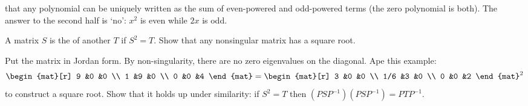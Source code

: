 \begin{exercises}
\begin{answer}
      that any polynomial can be uniquely
       written as the sum of even-powered and odd-powered terms (the
       zero polynomial is both).
       The answer to the second half is `no': \( x^2 \) is even while
       \( 2x \) is odd.  
     \end{answer}
   \item 
     A matrix \( S \) is the 
     of another \( T \) if \( S^2=T \).
     Show that any nonsingular matrix has a square root.
     \begin{answer}
         Put the matrix in Jordan form.
         By non-singularity, there are no zero eigenvalues on the diagonal.
         Ape this example:
          \begin{equation*}
             \begin{mat}[r]
                9  &0  &0 \\
                1  &9  &0 \\
                0  &0  &4
             \end{mat}
             =
             \begin{mat}[r]
                3  &0  &0 \\
               1/6 &3  &0 \\
                0  &0  &2
             \end{mat}^2
          \end{equation*}
         to construct a square root.
         Show that it holds up under similarity: if \( S^2=T \) then
         \( (PSP^{-1})(PSP^{-1})=PTP^{-1} \). 
    \end{answer}
\end{exercises}
